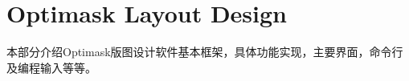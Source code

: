 \documentclass[10pt,twoside]{book}
\begin{document}





\normalsize

%

\part{Optimask Layout Design} \label{PartMaskDesign}
本部分介绍Optimask版图设计软件基本框架，具体功能实现，主要界面，命令行及编程输入等等。






\appendix
%
\end{document}
